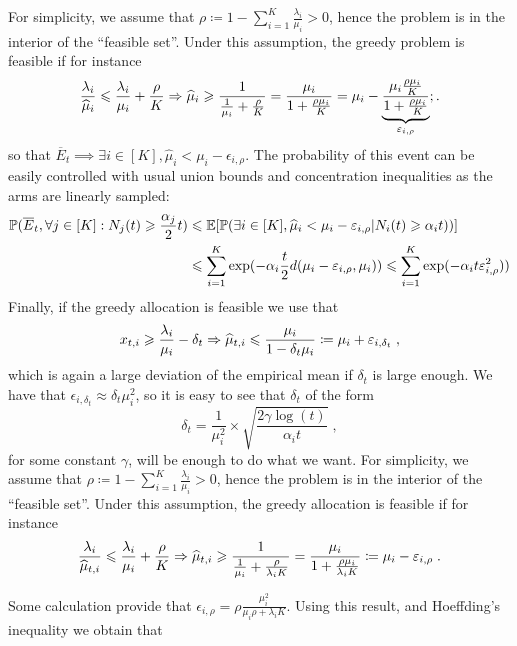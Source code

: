 For simplicity, we assume that $\rho \coloneqq 1- \sum_{i=1}^K \frac{\lambda_i}{\mu_i}>0$, hence the problem is in the interior of the ``feasible set''. 
Under this assumption, the greedy problem is feasible if for instance 
\[\frac{\lambda_i}{\widehat{\mu}_i}\leqslant \frac{\lambda_i}{\mu_i}+ \frac{\rho}{K} \Rightarrow \widehat{\mu}_i \geqslant \frac{1}{\frac{1}{\mu_i}+\frac{\rho}{K}}=\frac{\mu_i}{1+\frac{\rho \mu_i}{K}} = \mu_{i} - \underbrace{\frac{\mu_i \frac{\rho \mu_i}{K}}{1+\frac{\rho \mu_i}{K}}}_{\varepsilon_{i, \rho }} ;.\]
so that $\overline{E}_t \implies \exists i \in [K], \hat{\mu}_{i} <  \mu_{i}  - \epsilon_{i, \rho}$.
The probability of this event can be easily controlled with usual union bounds and concentration inequalities as the arms are linearly sampled:
\begin{align*}
\mathbb{P}( \overline{E}_{t}, \forall j \in [K]: N_j(t) \geqslant \frac{\alpha_j}{2}t ) &\leqslant \mathbb{E}[\mathbb{P}( \exists i \in [K],  \widehat{\mu}_{i} <  \mu_{i}  - \varepsilon_{i, \rho}  | N_i(t) \geqslant \alpha_{i}t) )]	 \\
&\leqslant \sum_{i=1}^K \exp(- \alpha_i \frac{t}{2} d(\mu_i - \varepsilon_{i, \rho}, \mu_{i})) \leqslant \sum_{i=1}^K \exp(- \alpha_i t \varepsilon_{i, \rho}^2))
\end{align*}
Finally, if the greedy allocation is feasible we use that
\[x_{t,i} \geqslant \frac{\lambda_i}{\mu_i} - \delta_t \Rightarrow \widehat{\mu}_{t,i} \leqslant \frac{\mu_i}{1-\delta_t \mu_i} \coloneqq \mu_i + \varepsilon_{i, \delta_t} \;, \]
which is again a large deviation of the empirical mean if $\delta_t$ is large enough. We have that $\epsilon_{i, \delta_t} \approx \delta_t \mu_i^2$, so it is easy to see that $\delta_t$ of the form \[\delta_t = \frac{1}{\mu_i^2} \times \sqrt{\frac{2\gamma \log(t)}{\alpha_i t}}\;,\] 
for some constant $\gamma$, will be enough to do what we want.
For simplicity, we assume that $\rho \coloneqq 1- \sum_{i=1}^K \frac{\lambda_i}{\mu_i}>0$, hence the problem is in the interior of the ``feasible set''. Under this assumption, the greedy allocation is feasible if for instance \[\frac{\lambda_i}{\widehat{\mu}_{t, i}}\leqslant \frac{\lambda_i}{\mu_i}+ \frac{\rho}{K} \Rightarrow \widehat{\mu}_{t, i} \geqslant \frac{1}{\frac{1}{\mu_i}+\frac{\rho}{\lambda_iK}}=\frac{\mu_i}{1+\frac{\rho \mu_i}{\lambda_i K}}\coloneqq \mu_i - \varepsilon_{i, \rho}\;.\]

Some calculation provide that $\epsilon_{i, \rho}=\rho \frac{\mu_i^2}{\mu_i \rho + \lambda_i K}$. Using this result, and Hoeffding's inequality we obtain that 

